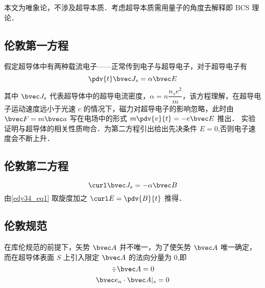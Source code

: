 

本文为唯象论，不涉及超导本质．考虑超导本质需用量子的角度去解释即 BCS 理论．
\subsection{伦敦第一方程}
假定超导体中有两种载流电子——正常传到电子与超导电子，对于超导电子有
\begin{equation}
\pdv{t}\bvec J_s=\alpha\bvec E \label{edy34_eq1}
\end{equation}
其中 $\bvec J_s$ 代表超导体中的超导电流密度，$\alpha=n\dfrac {n_se^2}m$，该方程理解，在超导电子运动速度远小于光速 $c$ 的情况下，磁力对超导电子的影响忽略，此时由 $\bvec F=m \bvec a$ 写在电场中的形式 $m\pdv{v}{t}=-e\bvec E$ 推出．
实验证明与超导体的相关性质吻合．为第二方程引出给出先决条件 $E=0$,否则电子速度会不断上升．
\subsection{伦敦第二方程}
\begin{equation}
\curl\bvec J_s=-\alpha\bvec B \label{edy34_eq2}
\end{equation}
由\autoref{edy34_eq1} 取旋度加之 $\curl E=\pdv{B}{t}$ 推得．
\subsection{伦敦规范}
在库伦规范的前提下，矢势 $\bvec A$ 并不唯一，为了使矢势 $\bvec A$ 唯一确定，而在超导体表面 $S$ 上引入限定 $\bvec A$ 的法向分量为 $0$,即
\begin{equation}
\div \bvec A=0
\end{equation}
\begin{equation}
\bvec e_n \cdot \bvec A|_s=0
\end{equation}
